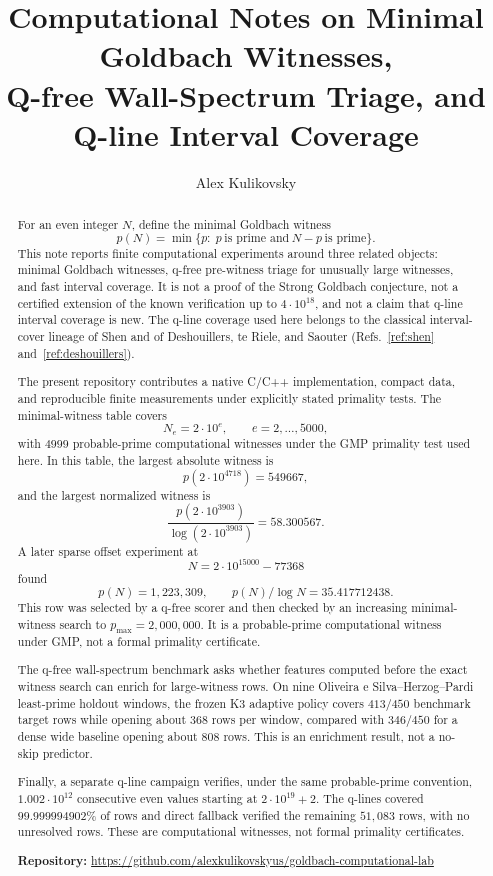 \documentclass[11pt]{article}
\title{Computational Notes on Minimal Goldbach Witnesses,\\
Q-free Wall-Spectrum Triage, and Q-line Interval Coverage}
\author{Alex Kulikovsky}
\date{}
\newcommand{\Ne}{N_e}
\begin{document}
\maketitle

\begin{abstract}
For an even integer \(N\), define the minimal Goldbach witness
\[
  p(N)=\min\{p:\;p\ \text{is prime and}\ N-p\ \text{is prime}\}.
\]
This note reports finite computational experiments around three related
objects: minimal Goldbach witnesses, q-free pre-witness triage for unusually
large witnesses, and fast interval coverage. It is not a proof of the Strong
Goldbach conjecture, not a certified extension of the known verification up to
\(4\cdot10^{18}\), and not a claim that q-line interval coverage is new. The
q-line coverage used here belongs to the classical interval-cover lineage of
Shen and of Deshouillers, te Riele, and Saouter
(Refs.~\ref{ref:shen} and~\ref{ref:deshouillers}).

The present repository contributes a native C/C++ implementation, compact data,
and reproducible finite measurements under explicitly stated primality tests.
The minimal-witness table covers
\[
  \Ne=2\cdot10^e,\qquad e=2,\ldots,5000,
\]
with \(4999\) probable-prime computational witnesses under the GMP primality
test used here. In this table, the largest absolute witness is
\[
  p(2\cdot10^{4718})=549667,
\]
and the largest normalized witness is
\[
  \frac{p(2\cdot10^{3903})}{\log(2\cdot10^{3903})}=58.300567.
\]
A later sparse offset experiment at
\[
  N=2\cdot10^{15000}-77368
\]
found
\[
  p(N)=1{,}223{,}309,\qquad p(N)/\log N=35.417712438.
\]
This row was selected by a q-free scorer and then checked by an increasing
minimal-witness search to \(p_{\max}=2{,}000{,}000\). It is a probable-prime
computational witness under GMP, not a formal primality certificate.

The q-free wall-spectrum benchmark asks whether features computed before the
exact witness search can enrich for large-witness rows. On nine Oliveira e
Silva--Herzog--Pardi least-prime holdout windows, the frozen K3 adaptive policy
covers \(413/450\) benchmark target rows while opening about \(368\) rows per
window, compared with \(346/450\) for a dense wide baseline opening about
\(808\) rows. This is an enrichment result, not a no-skip predictor.

Finally, a separate q-line campaign verifies, under the same probable-prime
convention, \(1.002\cdot10^{12}\) consecutive even values starting at
\(2\cdot10^{19}+2\). The q-lines covered
\(99.999994902\%\) of rows and direct fallback verified the remaining
\(51{,}083\) rows, with no unresolved rows. These are computational witnesses,
not formal primality certificates.

\medskip
\noindent\textbf{Repository:}
\url{https://github.com/alexkulikovskyus/goldbach-computational-lab}
\end{abstract}
\end{document}
